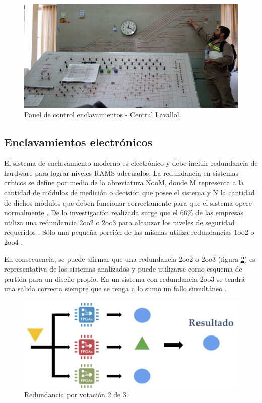 			\begin{figure}[h!]
				\centering
				\includegraphics[scale=.27]{./Figures/Electromecanico}
				\caption{Panel de control enclavamientos - Central Lavallol.}
				\label{fig:Electromecanico}
			\end{figure}
			
		\subsection{Enclavamientos electrónicos}
		\label{sec:Redundancia}	
			
			El sistema de enclavamiento moderno es electrónico y debe incluir redundancia de hardware para lograr niveles RAMS adecuados. La redundancia en sistemas críticos se define por medio de la abreviatura NooM, donde M representa a la cantidad de módulos de medición o decisión que posee el sistema y N la cantidad de dichos módulos que deben funcionar correctamente para que el sistema opere normalmente \cite{cite17}. De la investigación realizada surge que el $66$\% de las empresas utiliza una redundancia 2oo2 o 2oo3 para alcanzar los niveles de seguridad requeridos \cite{Trenes,cite5,cite6,cite9,cite10,cite12,cite13,cite14,cite15}. Sólo una pequeña porción de las mismas utiliza redundancias 1oo2 \cite{cite7} o 2oo4 \cite{cite8}. 
			
			En consecuencia, se puede afirmar que una redundancia 2oo2 o 2oo3 (figura \ref{fig:Redundancia}) es representativa de los sistemas analizados y puede utilizarse como esquema de partida para un diseño propio. En un sistema con redundancia 2oo3 se tendrá una salida correcta siempre que se tenga a lo sumo un fallo simultáneo \cite{REDUNDANCIA}. 
			
			\begin{figure}[h]
				\centering
				\includegraphics[scale=.45]{./Figures/Redundancia}
				\caption{Redundancia por votación 2 de 3.}
				\label{fig:Redundancia}
			\end{figure}
			
